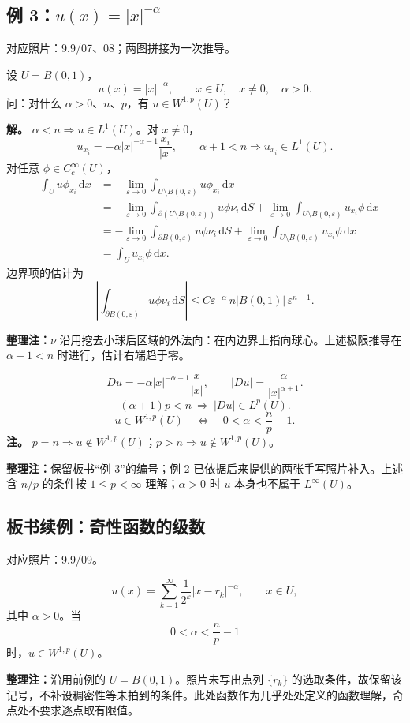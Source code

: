 \documentclass[UTF8,a4paper,11pt,fontset=fandol]{ctexart}
\newcommand{\dd}{\,\mathrm d}
\newcommand{\ednote}[1]{\par{\small\color{notegray}\textbf{整理注：}#1}\par}
\newcommand{\source}[1]{{\small\color{notegray}对应照片：#1。}\par}
\begin{document}
\newpage
\subsection*{例 3：$u(x)=|x|^{-\alpha}$}
\source{9.9/07、08；两图拼接为一次推导}
设 $U=B(0,1)$，
\[
u(x)=|x|^{-\alpha},\qquad x\in U,\quad x\ne0,\quad\alpha>0.
\]
问：对什么 $\alpha>0$、$n$、$p$，有 $u\in W^{1,p}(U)$？

\textbf{解。} $\alpha<n\Rightarrow u\in L^1(U)$。对 $x\ne0$，
\[
u_{x_i}=-\alpha|x|^{-\alpha-1}\frac{x_i}{|x|},
\qquad\alpha+1<n\Rightarrow u_{x_i}\in L^1(U).
\]
对任意 $\phi\in C_c^\infty(U)$，
\[
\begin{aligned}
-\int_Uu\phi_{x_i}\dd x
&=-\lim_{\varepsilon\to0}\int_{U\setminus B(0,\varepsilon)}u\phi_{x_i}\dd x\\
&=-\lim_{\varepsilon\to0}\int_{\partial(U\setminus B(0,\varepsilon))}
 u\phi\nu_i\dd S
 +\lim_{\varepsilon\to0}\int_{U\setminus B(0,\varepsilon)}u_{x_i}\phi\dd x\\
&=-\lim_{\varepsilon\to0}\int_{\partial B(0,\varepsilon)}u\phi\nu_i\dd S
 +\lim_{\varepsilon\to0}\int_{U\setminus B(0,\varepsilon)}u_{x_i}\phi\dd x\\
&=\int_Uu_{x_i}\phi\dd x.
\end{aligned}
\]
边界项的估计为
\[
\left|\int_{\partial B(0,\varepsilon)}u\phi\nu_i\dd S\right|
\leq C\varepsilon^{-\alpha}\,n|B(0,1)|\,\varepsilon^{n-1}.
\]
\ednote{$\nu$ 沿用挖去小球后区域的外法向：在内边界上指向球心。上述极限推导在 $\alpha+1<n$ 时进行，估计右端趋于零。}
\begin{center}
\end{center}
\[
Du=-\alpha|x|^{-\alpha-1}\frac{x}{|x|},\qquad
|Du|=\frac{\alpha}{|x|^{\alpha+1}}.
\]
\[
(\alpha+1)p<n\ \Longrightarrow\ |Du|\in L^p(U).
\]
\[
\boxed{u\in W^{1,p}(U)\quad\Longleftrightarrow\quad0<\alpha<\frac np-1.}
\]
\textbf{注。} $p=n\Rightarrow u\notin W^{1,p}(U)$；$p>n\Rightarrow u\notin W^{1,p}(U)$。
\ednote{保留板书“例 3”的编号；例 2 已依据后来提供的两张手写照片补入。上述含 $n/p$ 的条件按 $1\leq p<\infty$ 理解；$\alpha>0$ 时 $u$ 本身也不属于 $L^\infty(U)$。}

\newpage
\subsection*{板书续例：奇性函数的级数}
\source{9.9/09}
\[
u(x)=\sum_{k=1}^{\infty}\frac1{2^k}|x-r_k|^{-\alpha},\qquad x\in U,
\]
其中 $\alpha>0$。当
\[
0<\alpha<\frac np-1
\]
时，$u\in W^{1,p}(U)$。
\ednote{沿用前例的 $U=B(0,1)$。照片未写出点列 $\{r_k\}$ 的选取条件，故保留该记号，不补设稠密性等未拍到的条件。此处函数作为几乎处处定义的函数理解，奇点处不要求逐点取有限值。}
\end{document}
